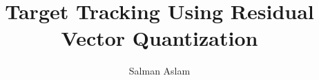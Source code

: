 \documentclass[12pt,letterpaper,doublespaced,ETD]{gt-ece-thesis} %
\title{Target Tracking Using Residual Vector Quantization}
\author{Salman Aslam}
\begin{document}
\begin{FrontMatter}
\contents %
\end{FrontMatter}




\end{document}
